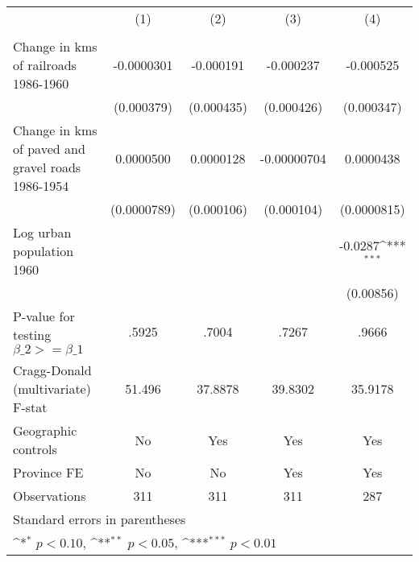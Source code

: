 {
\def\sym#1{\ifmmode^{#1}\else\(^{#1}\)\fi}
\begin{tabular}{l*{4}{c}}
\hline\hline
                &\multicolumn{1}{c}{(1)}&\multicolumn{1}{c}{(2)}&\multicolumn{1}{c}{(3)}&\multicolumn{1}{c}{(4)}\\
                &\multicolumn{1}{c}{}&\multicolumn{1}{c}{}&\multicolumn{1}{c}{}&\multicolumn{1}{c}{}\\
\hline
Change in kms of railroads 1986-1960&-0.0000301         &-0.000191         &-0.000237         &-0.000525         \\
                &(0.000379)         &(0.000435)         &(0.000426)         &(0.000347)         \\
[1em]
Change in kms of paved and gravel roads 1986-1954&0.0000500         &0.0000128         &-0.00000704         &0.0000438         \\
                &(0.0000789)         &(0.000106)         &(0.000104)         &(0.0000815)         \\
[1em]
Log urban population 1960&                  &                  &                  &  -0.0287\sym{***}\\
                &                  &                  &                  &(0.00856)         \\
\hline
P-value for testing $\beta\_{2} >= \beta\_{1}$&    .5925         &    .7004         &    .7267         &    .9666         \\
Cragg-Donald (multivariate) F-stat&   51.496         &  37.8878         &  39.8302         &  35.9178         \\
Geographic controls&       No         &      Yes         &      Yes         &      Yes         \\
Province FE     &       No         &       No         &      Yes         &      Yes         \\
Observations    &      311         &      311         &      311         &      287         \\
\hline\hline
\multicolumn{5}{l}{\footnotesize Standard errors in parentheses}\\
\multicolumn{5}{l}{\footnotesize \sym{*} \(p<0.10\), \sym{**} \(p<0.05\), \sym{***} \(p<0.01\)}\\
\end{tabular}
}
